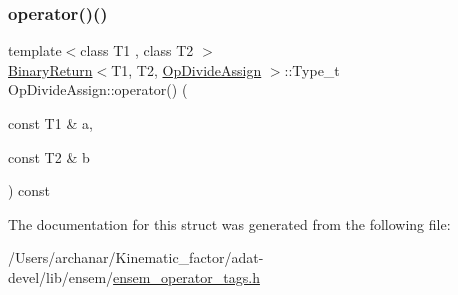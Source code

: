 \subsubsection{\texorpdfstring{operator()()}{operator()()}\hspace{0.1cm}{\footnotesize\ttfamily [3/3]}}
{\footnotesize\ttfamily template$<$class T1 , class T2 $>$ \\
\mbox{\hyperlink{structBinaryReturn}{Binary\+Return}}$<$T1, T2, \mbox{\hyperlink{structOpDivideAssign}{Op\+Divide\+Assign}} $>$\+::Type\+\_\+t Op\+Divide\+Assign\+::operator() (\begin{DoxyParamCaption}\item[{const T1 \&}]{a,  }\item[{const T2 \&}]{b }\end{DoxyParamCaption}) const\hspace{0.3cm}{\ttfamily [inline]}}



The documentation for this struct was generated from the following file\+:\begin{DoxyCompactItemize}
\item 
/\+Users/archanar/\+Kinematic\+\_\+factor/adat-\/devel/lib/ensem/\mbox{\hyperlink{adat-devel_2lib_2ensem_2ensem__operator__tags_8h}{ensem\+\_\+operator\+\_\+tags.\+h}}\end{DoxyCompactItemize}
